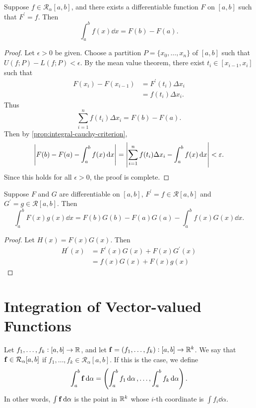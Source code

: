 \begin{theorem}
Suppose $f\in \mathcal{R}_\alpha[a,b]$, and there exists a differentiable function $F$ on $[a,b]$ such that $F^\prime=f$. Then
\begin{equation}
\int_a^b f(x)\dd{x}=F(b)-F(a).
\end{equation}
\end{theorem}

\begin{proof}
Let $\epsilon>0$ be given. Choose a partition $P=\{x_0,\dots,x_n\}$ of $[a,b]$ such that $U(f;P)-L(f;P)<\epsilon$. By the mean value theorem, there exist $t_i\in[x_{i-1},x_i]$ such that
\begin{align*}
F(x_i)-F(x_{i-1})
&=F^\prime(t_i)\Delta x_i\\
&=f(t_i)\Delta x_i.
\end{align*}
Thus
\[\sum_{i=1}^{n}f(t_i)\Delta x_i=F(b)-F(a).\]
Then by \cref{prop:integral-cauchy-criterion},
\[\left|F(b)-F(a)-\int_{a}^{b}f(x)\dd{x}\right|
=\left|\sum_{i=1}^{n}f(t_i)\Delta x_i-\int_{a}^{b}f(x)\dd{x}\right|
<\varepsilon.\]
Since this holds for all $\epsilon>0$, the proof is complete.
\end{proof}

\begin{lemma}
Suppose $F$ and $G$ are differentiable on $[a,b]$, $F^\prime=f\in\mathcal{R}[a,b]$ and $G^\prime=g\in\mathcal{R}[a,b]$. Then
\begin{equation}
\int_a^b F(x)g(x)\dd{x}=F(b)G(b)-F(a)G(a)-\int_a^b f(x)G(x)\dd{x}.
\end{equation}
\end{lemma}

\begin{proof}
Let $H(x)=F(x)G(x)$. Then
\begin{align*}
H^\prime(x)
&=F^\prime(x)G(x)+F(x)G^\prime(x)\\
&=f(x)G(x)+F(x)g(x)
\end{align*}
\end{proof}
\pagebreak

\section{Integration of Vector-valued Functions}
\begin{definition}
Let $f_1,\dots,f_k:[a,b]\to\mathbb R$, and let $\vb{f}=(f_1,\dots,f_k):[a,b]\to\mathbb R^k$. We say that $\vb{f}\in\mathcal{R}_\alpha[a,b]$ if $f_1,\dots,f_k\in\mathcal{R}_\alpha[a,b]$. If this is the case, we define
\[\int_{a}^{b}\vb{f}\dd{\alpha}=\left(\int_{a}^{b}f_1\dd{\alpha},\dots,\int_{a}^{b}f_k\dd{\alpha}\right).\]
In other words, $\int\vb{f}\dd{\alpha}$ is the point in $\mathbb R^k$ whose $i$-th coordinate is $\int f_i\dd{\alpha}$.
\end{definition}

